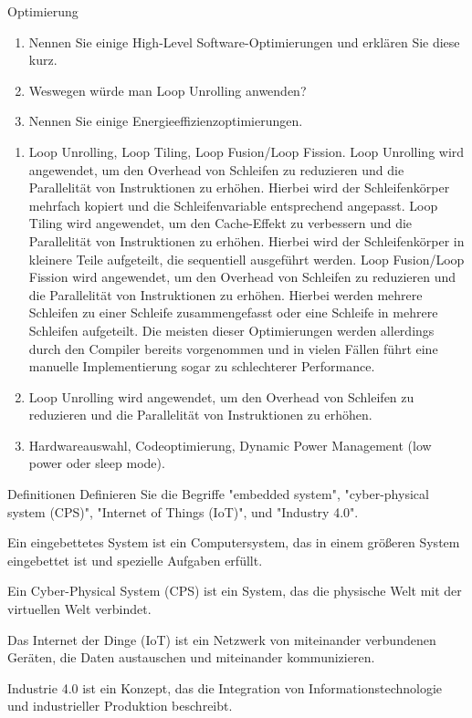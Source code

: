 \documentclass{article}
\begin{document}
\begin{exercise}{Optimierung}
  \begin{enumerate}
    \item Nennen Sie einige High-Level Software-Optimierungen und erklären Sie diese kurz.
    \item Weswegen würde man Loop Unrolling anwenden?
    \item Nennen Sie einige Energieeffizienzoptimierungen.
  \end{enumerate}

  \begin{solution}
    \begin{enumerate}
      \item Loop Unrolling, Loop Tiling, Loop Fusion/Loop Fission.
            Loop Unrolling wird angewendet, um den Overhead von Schleifen zu reduzieren und die Parallelität von Instruktionen zu erhöhen. Hierbei wird der Schleifenkörper mehrfach kopiert und die Schleifenvariable entsprechend angepasst.
            Loop Tiling wird angewendet, um den Cache-Effekt zu verbessern und die Parallelität von Instruktionen zu erhöhen. Hierbei wird der Schleifenkörper in kleinere Teile aufgeteilt, die sequentiell ausgeführt werden.
            Loop Fusion/Loop Fission wird angewendet, um den Overhead von Schleifen zu reduzieren und die Parallelität von Instruktionen zu erhöhen. Hierbei werden mehrere Schleifen zu einer Schleife zusammengefasst oder eine Schleife in mehrere Schleifen aufgeteilt.
            Die meisten dieser Optimierungen werden allerdings durch den Compiler bereits vorgenommen und in vielen Fällen führt eine manuelle Implementierung sogar zu schlechterer Performance.
      \item Loop Unrolling wird angewendet, um den Overhead von Schleifen zu reduzieren und die Parallelität von Instruktionen zu erhöhen.
      \item Hardwareauswahl, Codeoptimierung, Dynamic Power Management (low power oder sleep mode).
    \end{enumerate}
  \end{solution}
\end{exercise}

\begin{exercise}{Definitionen}
  Definieren Sie die Begriffe "embedded system", "cyber-physical system (CPS)", "Internet of Things (IoT)", und "Industry 4.0".

  \begin{solution}
    Ein eingebettetes System ist ein Computersystem, das in einem größeren System eingebettet ist und spezielle Aufgaben erfüllt.

    Ein Cyber-Physical System (CPS) ist ein System, das die physische Welt mit der virtuellen Welt verbindet.

    Das Internet der Dinge (IoT) ist ein Netzwerk von miteinander verbundenen Geräten, die Daten austauschen und miteinander kommunizieren.

    Industrie 4.0 ist ein Konzept, das die Integration von Informationstechnologie und industrieller Produktion beschreibt.
  \end{solution}
\end{exercise}
\end{document}
